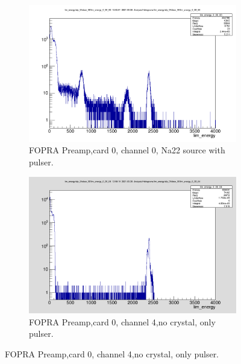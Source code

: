 \documentclass{report}
\begin{document}
\begin{figure}[!htb]
  \centering
  \begin{subfigure}[b]{0.45\textwidth}
    \includegraphics[width=\linewidth]{fopra_preamp_lim_energy_card0_ch0.png}
    \caption{FOPRA Preamp,card 0, channel 0, Na22 source with pulser.}
  \end{subfigure}
  \begin{subfigure}[b]{0.45\textwidth}
    \includegraphics[width=\linewidth]{fopra_preamp_lim_energy_card0_ch4_no_crystal.png}
    \caption{FOPRA Preamp,card 0, channel 4,no crystal, only pulser.}
  \end{subfigure}
\end{figure}
\end{document}
